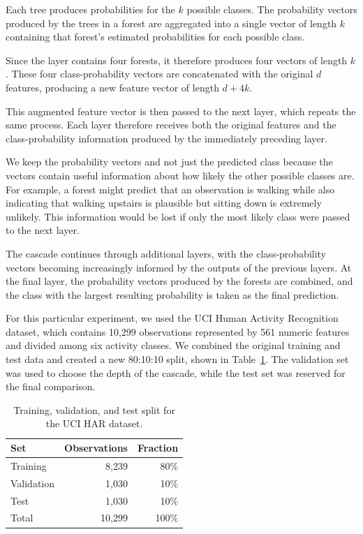 \documentclass[12pt]{article}
\begin{document}
\begin{enumerate}
Each tree produces probabilities for the $k$ possible classes. The probability vectors produced by the trees in a forest are aggregated into a single vector of length $k$ containing that forest's estimated probabilities for each possible class.

Since the layer contains four forests, it therefore produces four vectors of length $k$. These four class-probability vectors are concatenated with the original $d$ features, producing a new feature vector of length $d + 4k.$

This augmented feature vector is then passed to the next layer, which repeats the same process. Each layer therefore receives both the original features and the class-probability information produced by the immediately preceding layer.

We keep the probability vectors and not just the predicted class because the vectors contain useful information about how likely the other possible classes are. For example, a forest might predict that an observation is walking while also indicating that walking upstairs is plausible but sitting down is extremely unlikely. This information would be lost if only the most likely class were passed to the next layer.

The cascade continues through additional layers, with the class-probability vectors becoming increasingly informed by the outputs of the previous layers. At the final layer, the probability vectors produced by the forests are combined, and the class with the largest resulting probability is taken as the final prediction.

For this particular experiment, we used the UCI Human Activity Recognition dataset, which contains 10,299 observations represented by 561 numeric features and divided among six activity classes. We combined the original training and test data and created a new 80:10:10 split, shown in Table~\ref{tab:q6-split}. The validation set was used to choose the depth of the cascade, while the test set was reserved for the final comparison.

\begin{table}[h]
\centering
\begin{tabular}{lrr}
\toprule
\textbf{Set} & \textbf{Observations} & \textbf{Fraction} \\
\midrule
Training   & 8,239 & 80\% \\
Validation & 1,030 & 10\% \\
Test       & 1,030 & 10\% \\
\midrule
Total      & 10,299 & 100\% \\
\bottomrule
\end{tabular}
\caption{Training, validation, and test split for the UCI HAR dataset.}
\label{tab:q6-split}
\end{table}


\end{enumerate}
\end{document}
